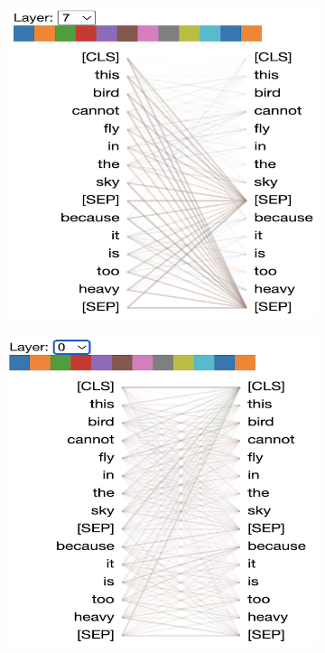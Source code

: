 \documentclass[]{article}
\begin{document}
\begin{figure}[!h]
    \centering
    \begin{subfigure}[b]{0.48\textwidth}
        \includegraphics[width=\textwidth]{FIGS/bert_head_l7.png}
    \end{subfigure} 
    \hfill
    \begin{subfigure}[b]{0.48\textwidth}
        \includegraphics[width=\textwidth]{FIGS/bert_head_l0.png}

\end{subfigure}
\end{figure}
\end{document}
